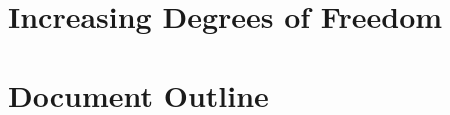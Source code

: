    	\section{Increasing Degrees of Freedom}\label{sec:numdof}
		


	
	\section{Document Outline} 
	
			
			
			
			
			
			

	

